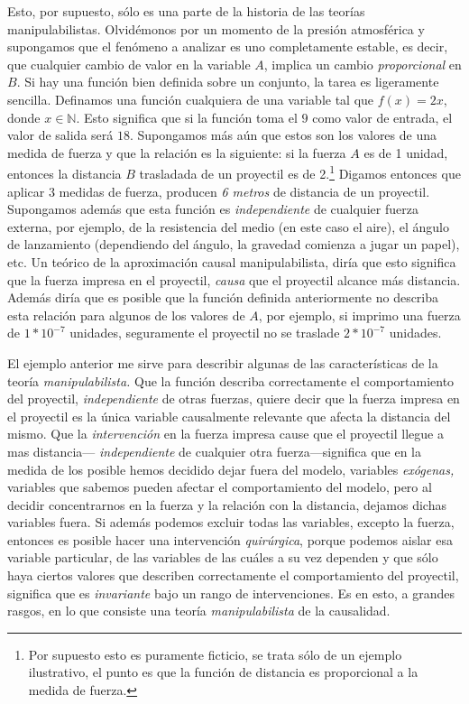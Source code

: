 Esto, por supuesto, sólo es una parte de la historia de las
teorías manipulabilistas. Olvidémonos por un momento de la
presión atmosférica y supongamos que el fenómeno a analizar
es uno completamente estable, es decir, que cualquier cambio
de valor en la variable $ A $, implica un cambio
\emph{proporcional} en $ B $. Si hay una función bien
definida sobre un conjunto, la tarea es ligeramente
sencilla. Definamos una función cualquiera de una variable
tal que $ f(x) = 2x $, donde $ x \in  \mathbb{N} $. Esto
significa que si la función toma el $ 9 $ como valor de
entrada, el valor de salida será $ 18 $. Supongamos más aún
que estos son los valores de una medida de fuerza y que la
relación es la siguiente: si la fuerza $ A $ es de 1 unidad,
entonces la distancia $ B $ trasladada de un proyectil es de
2.\footnote{ 
	Por supuesto esto es puramente ficticio, se
	trata sólo de un ejemplo ilustrativo, el punto es
	que la función de distancia es proporcional a la
	medida de fuerza.
} 
Digamos entonces que aplicar 3 medidas de fuerza, producen
\emph{6 metros} de distancia de un proyectil. Supongamos
además que esta función es \emph{independiente} de cualquier
fuerza externa, por ejemplo, de la resistencia del medio (en
este caso el aire), el ángulo de lanzamiento (dependiendo
del ángulo, la gravedad comienza a jugar un papel), etc. Un
teórico de la aproximación causal manipulabilista, diría que
esto significa que la fuerza impresa en el proyectil,
\emph{causa} que el proyectil alcance más distancia. Además
diría que es posible que la función definida anteriormente
no describa esta relación para algunos de los valores de $ A
$, por ejemplo, si imprimo una fuerza de $ 1*10^{-7} $
unidades, seguramente el proyectil no se traslade $
2*10^{-7} $ unidades.

El ejemplo anterior me sirve para describir algunas de las
características de la teoría \emph{manipulabilista.} Que la
función describa correctamente el comportamiento del
proyectil, \emph{independiente} de otras fuerzas, quiere
decir que la fuerza impresa en el proyectil es la única
variable causalmente relevante que afecta la distancia del
mismo. Que la \emph{intervención} en la fuerza impresa cause
que el proyectil llegue a mas distancia---
\emph{independiente} de cualquier otra fuerza---significa
que en la medida de los posible hemos decidido dejar fuera
del modelo, variables \emph{exógenas,} variables que sabemos
pueden afectar el comportamiento del modelo, pero al decidir
concentrarnos en la fuerza y la relación con la distancia,
dejamos dichas variables fuera. Si además podemos excluir
todas las variables, excepto la fuerza, entonces es posible
hacer una intervención \emph{quirúrgica}, porque podemos
aislar esa variable particular, de las variables de las
cuáles a su vez dependen y que sólo haya ciertos valores que
describen correctamente el comportamiento del proyectil,
significa que es \emph{invariante} bajo un rango de
intervenciones. Es en esto, a grandes rasgos, en lo que
consiste una teoría \emph{manipulabilista} de la causalidad.

